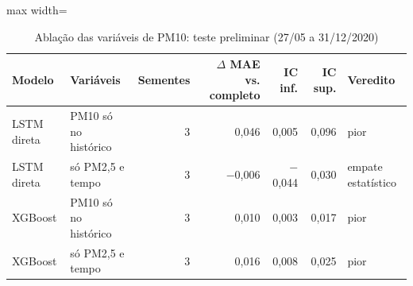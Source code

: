 \begin{table}[!htbp]
    \centering
    \caption{Ablação das variáveis de PM10: teste preliminar (27/05 a 31/12/2020)}
    \label{tab:ablacao_pm10_teste_historico}
    \small
    \begin{adjustbox}{max width=\textwidth}
    \begin{tabular}{llrrrrl}
        \toprule
        Modelo & Variáveis & Sementes & $\Delta$ MAE vs. completo & IC inf. & IC sup. & Veredito \\
        \midrule
        LSTM direta & PM10 só no histórico & 3 & 0,046 & 0,005 & 0,096 & pior \\
        LSTM direta & só PM2,5 e tempo & 3 & $-$0,006 & $-$0,044 & 0,030 & empate estatístico \\
        XGBoost & PM10 só no histórico & 3 & 0,010 & 0,003 & 0,017 & pior \\
        XGBoost & só PM2,5 e tempo & 3 & 0,016 & 0,008 & 0,025 & pior \\
        \bottomrule
    \end{tabular}
    \end{adjustbox}
\end{table}

